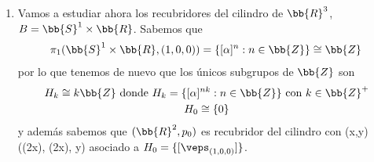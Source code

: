 \begin{ejemplo}
\begin{enumerate}
        También podemos considerar el recubridor $(\bb{S}^1, p_1=Id_{\bb{S}^1})$ cuyo subgrupo asociado es $H_1 = \pi_1(\bb{S}^1, (1,0))$.\\

        Ahora nos planteamos de nuevo que $\bb{S}^1$ es recubridor de sí mismo pero que hay más formas de recubrirse, es decir, podemos encontrar funciones recubridoras $p_k$ con $k\in \bb{Z}^+$ de forma que todas recubran a la circunferencia pero ``enrollandola más'', es decir, llevando cada vuelta de $R=\bb{S}^1$ en $k$ vueltas de $B=\bb{S}^1$. Definimos así la aplicación $p_k$ para $k\geq 2$ (el caso $k=1$ es la identidad que ya se ha estudiado) dada por 
             {(\cos(\theta), \sen(\theta))}{(\cos(k\theta), \sen(k\theta))}
        Además tendríamos que 
             {[\alpha]}{[\alpha]^k}
        Llegando a que 
        \begin{gather*}
            p_{k*}(\pi_1(\bb{S}^1, (1,0))) = H_k = \{[\alpha]^{kn} : n\in \bb{Z}\}
        \end{gather*}
        Por tanto, los únicos recubridores de $\bb{S}^1$ son
        \begin{gather*}
            (\bb{R}, p)\text{ con } p(t)=(\cos(2\pi t), \sen(2\pi t))\\
            (\bb{S}^1, p_k)\text{ con } p_k(\cos(\theta), \sen(\theta)) = (\cos(k\theta), \sen(k\theta)) \text{ para todo } k\in \bb{Z}^+
        \end{gather*}

        \item Vamos a estudiar ahora los recubridores del cilindro de $\bb{R}^3$, $B=\bb{S}^1\times \bb{R}$. Sabemos que
        \begin{gather*}
            \pi_1(\bb{S}^1\times \bb{R}, (1,0,0)) = \{[\alpha]^n : n\in \bb{Z}\} \cong \bb{Z}
        \end{gather*}
        por lo que tenemos de nuevo que los únicos subgrupos de $\bb{Z}$ son 
        \begin{gather*}
            H_k \cong k\bb{Z} \text{ donde } H_k = \{[\alpha]^{nk} : n\in \bb{Z}\} \text{ con } k\in \bb{Z}^+\\
            H_0 \cong \{0\}
        \end{gather*}
        y además sabemos que $(\bb{R}^2, p_0)$ es recubridor del cilindro con
             {(x,y)}{(\cos(2\pi x), \sen(2\pi x), y)}
        asociado a $H_0=\{[\veps_{(1,0,0)}]\}$.\\


\end{enumerate}
\end{ejemplo}
